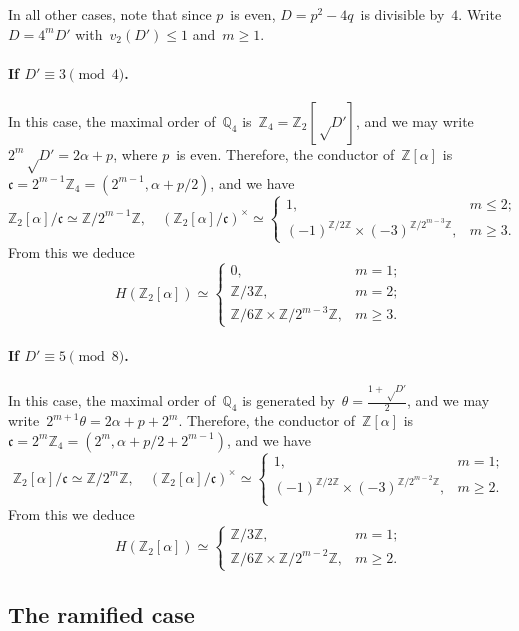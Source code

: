 \documentclass{article}
\let\fr\mathfrak
\begin{document}
\medskip

In all other cases, note that since $p$~is even, $D = p^2-4q$~is
divisible by~$4$. Write~$D = 4^m D'$ with~$v_2(D') ≤ 1$ and~$m ≥ 1$.

\paragraph{If $D' ≡ 3 \pmod{4}$.} In this case, the maximal order
of~$ℚ_4$ is~$ℤ_4 = ℤ_2[√{D'}]$, and we may write~$2^m √{D'} = 2α + p$,
where $p$~is even. Therefore, the conductor of~$ℤ[α]$ is~$\fr c = 2^{m-1}
ℤ_4 = (2^{m-1}, α+p/2)$, and we have
\begin{equation}
ℤ_2[α]/\fr c ≃ ℤ/2^{m-1} ℤ, \quad
(ℤ_2[α]/\fr c)^{×} ≃ \begin{cases} 1,&m ≤ 2;\\
(-1)^{ℤ/2ℤ} × (-3)^{ℤ/2^{m-3} ℤ},&m ≥ 3.\end{cases}
\end{equation}
From this we deduce
\begin{equation}
H(ℤ_2[α]) ≃ \begin{cases} 0, & m = 1;\\
ℤ/3ℤ, & m = 2;\\ ℤ/6ℤ × ℤ/2^{m-3}ℤ, & m ≥ 3. \end{cases}
\end{equation}

\paragraph{If $D' ≡ 5 \pmod{8}$.} In this case, the maximal order
of~$ℚ_4$ is generated by~$θ = \frac{1+√{D'}}{2}$, and we may
write~$2^{m+1} θ = 2α + p + 2^m$. Therefore, the conductor of~$ℤ[α]$
is~$\fr c = 2^{m} ℤ_4 = (2^m, α+p/2+2^{m-1})$, and we have
\begin{equation}
ℤ_2[α]/\fr c ≃ ℤ/2^m ℤ, \quad
(ℤ_2[α]/\fr c)^{×} ≃ \begin{cases} 1, & m = 1;\\
(-1)^{ℤ/2ℤ} × (-3)^{ℤ/2^{m-2}ℤ},& m ≥ 2.\\\end{cases}
\end{equation}
From this we deduce
\begin{equation}
H(ℤ_2[α]) ≃ 
\begin{cases} ℤ/3ℤ,& m = 1;\\ ℤ/6ℤ × ℤ/2^{m-2}ℤ, & m ≥ 2. \end{cases}
\end{equation}

\subsection{The ramified case}
\end{document}
